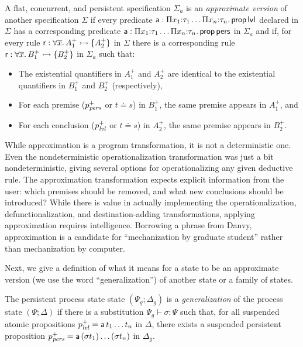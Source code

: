 \bigskip
\begin{definition}\label{def:approxversion}
  A flat, concurrent, and persistent specification $\Sigma_a$ is an
  {\em approximate version} of another specification $\Sigma$ if every
  predicate ${\sf a} : \Pi x_1{:}\tau_1 \ldots \Pi x_n{:}\tau_n.\,
  {\sf prop}\,{\sf lvl}$ declared in $\Sigma$ has a corresponding
  predicate ${\sf a} : \Pi x_1{:}\tau_1 \ldots \Pi x_n{:}\tau_n.\,
  {\sf prop}\,{\sf pers}$ in $\Sigma_a$ and if, for every rule ${\sf
    r} : \forall \overline{x}.\,A_1^+ \rightarrowtail \{ A_2^+ \}$ in $\Sigma$ there
  is a corresponding rule ${\sf r} : \forall \overline{x}.\,B_1^+ \rightarrowtail
  \{ B_2^+ \}$ in $\Sigma_a$ such that:
  \begin{itemize}
  \item The existential quantifiers in $A_1^+$ and $A_2^+$ are
    identical to the existential quantifiers in $B_1^+$ and $B_2^+$
    (respectively),
  \item For each premise ($p^+_{\it pers}$ or $t \doteq s$) in $B^+_1$,
    the same premise appears in $A^+_1$, and 
  \item For each conclusion ($p^+_{\it lvl}$ or $t
    \doteq s$) in $A^+_2$, the same premise appears in $B^+_2$.
  \end{itemize}
\end{definition}
\bigskip

\noindent
While approximation is a program transformation, it is not a
deterministic one. Even the nondeterministic operationalization
transformation was just a bit nondeterministic, giving several options
for operationalizing any given deductive rule. The approximation
transformation expects explicit information from the user: which
premises should be removed, and what new conclusions should be
introduced? While there is value in actually implementing the
operationalization, defunctionalization, and destination-adding
transformations, applying approximation requires
intelligence. Borrowing a phrase from Danvy, approximation is a
candidate for ``mechanization by graduate student'' rather than
mechanization by computer.

Next, we give a definition of what it means for a state to be an 
approximate version (we use the word ``generalization'') of another state
or a family of states. 

\bigskip
\begin{definition}
  The persistent process state state $(\Psi_g; \Delta_g)$ is a {\em
    generalization} of the process state $(\Psi; \Delta)$ if there is
  a substitution $\Psi_g \vdash \sigma : \Psi$ such that, for all
  suspended atomic propositions $p^+_{\it lvl} = {\sf a}\,t_1\ldots t_n$
  in $\Delta$, there exists a suspended persistent proposition
  $p^+_{\it pers} = {\sf a}\,(\sigma t_1)\ldots(\sigma t_n)$ in
  $\Delta_g$.
\end{definition}
\bigskip

